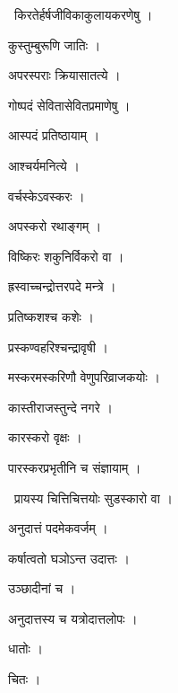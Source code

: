 \documentclass[10pt, openany, oneside]{book}
\begin{document}
\par\noindent\hspace{1.5em}{\vps वा॰}~{\qt किरतेर्हर्षजीविकाकुलायकरणेषु ।}

\noindent कुस्तुम्बुरूणि जातिः ।

\noindent अपरस्पराः क्रियासातत्ये ।

\noindent गोष्पदं सेवितासेवितप्रमाणेषु ।

\noindent आस्पदं प्रतिष्ठायाम् ।

\noindent आश्चर्यमनित्ये ।

\noindent वर्चस्केऽवस्करः ।

\noindent अपस्करो रथाङ्गम् ।

\noindent विष्किरः शकुनिर्विकरो वा ।

\noindent ह्रस्वाच्चन्द्रोत्तरपदे मन्त्रे ।

\noindent प्रतिष्कशश्च कशेः ।

\noindent प्रस्कण्वहरिश्चन्द्रावृषी ।

\noindent मस्करमस्करिणौ वेणुपरिव्राजकयोः ।

\noindent कास्तीराजस्तुन्दे नगरे ।

\noindent कारस्करो वृक्षः ।

\noindent पारस्करप्रभृतीनि च संज्ञायाम् ।

\par\noindent\hspace{1.5em}{\vps वा॰}~{\qt प्रायस्य चित्तिचित्तयोः सुडस्कारो वा ।}

\noindent अनुदात्तं पदमेकवर्जम् ।

\noindent कर्षात्वतो घञोऽन्त उदात्तः ।

\noindent उञ्छादीनां च ।

\noindent अनुदात्तस्य च यत्रोदात्तलोपः ।

\noindent धातोः ।

\noindent चितः ।
\end{document}
